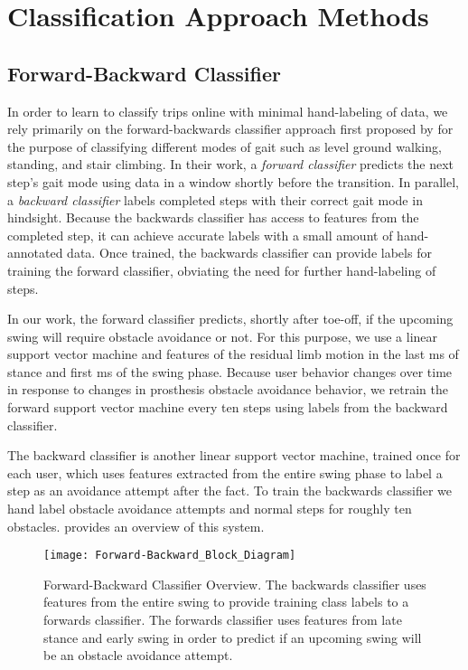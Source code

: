 \section{Classification Approach Methods}
\subsection{Forward-Backward Classifier}
In order to learn to classify trips online with minimal hand-labeling of data,
we rely primarily on the forward-backwards classifier approach first proposed by
\citet{spanias2018online} for the purpose of classifying different modes of gait
such as level ground walking, standing, and stair climbing. In their work, a
\emph{forward classifier} predicts the next step's gait mode using data in a
window shortly before the transition. In parallel, a \emph{backward classifier}
labels completed steps with their correct gait mode in hindsight. Because the
backwards classifier has access to features from the completed step, it can
achieve accurate labels with a small amount of hand-annotated data. Once
trained, the backwards classifier can provide labels for training the forward
classifier, obviating the need for further hand-labeling of steps. 

In our work, the forward classifier predicts, shortly after toe-off, if the
upcoming swing will require obstacle avoidance or not. For this purpose, we use
a linear support vector machine and features of the residual limb motion in the
last \unit[210]{ms} of stance and first \unit[90]{ms} of the swing phase.
Because user behavior changes over time in response to changes in prosthesis
obstacle avoidance behavior, we retrain the forward support vector machine every
ten steps using labels from the backward classifier. 

The backward classifier is another linear support vector machine, trained once
for each user, which uses features extracted from the entire swing phase to
label a step as an avoidance attempt after the fact. To train the backwards
classifier we hand label obstacle avoidance attempts and normal steps for
roughly ten obstacles.  provides an overview of this system.

\begin{figure}[tb]
\centerline{\texttt{[image: Forward-Backward\_Block\_Diagram]}}
\caption{Forward-Backward Classifier Overview. The backwards classifier uses
features from the entire swing to provide training class labels to a forwards
classifier. The forwards classifier uses features from late stance and early
swing in order to predict if an upcoming swing will be an obstacle avoidance
attempt.}\label{fig:fwd_back}
\end{figure}

